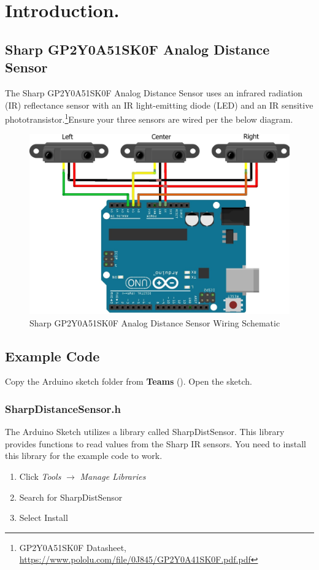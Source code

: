 \documentclass{handout}
\begin{document}
	\section{Introduction.}
	
	\subsection{Sharp GP2Y0A51SK0F Analog Distance Sensor}
	The Sharp GP2Y0A51SK0F Analog Distance Sensor uses an infrared radiation (IR) reflectance sensor with an IR light-emitting diode (LED) and an IR sensitive phototransistor.\footnote{GP2Y0A51SK0F Datasheet, \url{https://www.pololu.com/file/0J845/GP2Y0A41SK0F.pdf.pdf}}Ensure your three sensors are wired per the below diagram.
	
	\begin{figure} [H]
		\centering
		\includegraphics[width=.75\textwidth]{ir.jpg}
		\caption{Sharp GP2Y0A51SK0F Analog Distance Sensor Wiring Schematic}
		\label{Fig IR}
	\end{figure}



	
	\subsection{Example Code}
	Copy the Arduino sketch folder   from \textbf{Teams} (). Open the  sketch.
	
	\subsubsection{SharpDistanceSensor.h}
	The Arduino Sketch utilizes a library called SharpDistSensor. This library provides functions to read values from the Sharp IR sensors. You need to install this library for the example code to work.
	\begin{enumerate}
		\item Click \textit{Tools} $\rightarrow$ \textit{Manage Libraries}
		\item Search for SharpDistSensor
		\item Select Install
	\end{enumerate}
	
\end{document}
